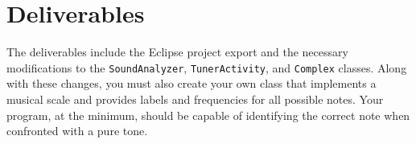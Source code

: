 \section{Deliverables}

The deliverables include the Eclipse project export and the necessary modifications to the {\tt SoundAnalyzer}, \verb=TunerActivity=, and \verb=Complex= classes. 
Along with these changes, you must also create your own class that implements a musical scale and provides labels and frequencies for all possible notes.
Your program, at the minimum, should be capable of identifying the correct note when confronted with a pure tone.
